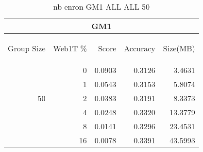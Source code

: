 \begin{center}
\begin{table}[htbp]
\begin{tabular}{ | r | r | r | r | r |}
\hline
\multicolumn{5}{|c|}{GM1}\\
\hline
\begin{sideways}Group Size\end{sideways} & \begin{sideways}Web1T \%\end{sideways} & \begin{sideways}Score\end{sideways} & \begin{sideways}Accuracy\end{sideways} & \begin{sideways}Size(MB)\end{sideways}\\
\hline
\multirow{5}{*}{50}
 & 0 & 0.0903 & 0.3126 & 3.4631\\ \cline{2-5}
 & 1 & 0.0543 & 0.3153 & 5.8074\\ \cline{2-5}
 & 2 & 0.0383 & 0.3191 & 8.3373\\ \cline{2-5}
 & 4 & 0.0248 & 0.3320 & 13.3779\\ \cline{2-5}
 & 8 & 0.0141 & 0.3296 & 23.4531\\ \cline{2-5}
 & 16 & 0.0078 & 0.3391 & 43.5993\\ \cline{2-5}
\hline
\end{tabular}
\caption{nb-enron-GM1-ALL-ALL-50}
\label{table:nb-enron-GM1-ALL-ALL-50}
\end{table}
\end{center}

